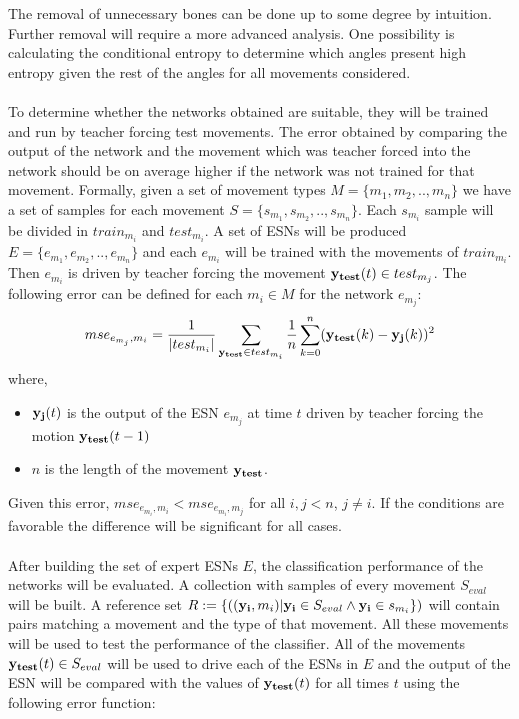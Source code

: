 \documentclass[10pt]{article}
\begin{document}
The removal of unnecessary bones can be done up to some degree by intuition. Further removal will require a more advanced analysis. One possibility is calculating the conditional entropy\cite{AILecture} to determine which angles present high entropy given the rest of the angles for all movements considered. 
\\\\
To determine whether the networks obtained are suitable, they will be trained and run by teacher forcing test movements. The error obtained by comparing the output of the network and the movement which was teacher forced into the network should be on average higher if the network was not trained for that movement. Formally, given a set of movement types $M=\{m_1,m_2,..,m_n\}$ we have a set of samples for each movement $S=\{s_{m_1},s_{m_2},..,s_{m_n}\}$. Each $s_{m_i}$ sample will be divided in $train_{m_i}$ and $test_{m_i}$. A set of ESNs will be produced $E=\{e_{m_1},e_{m_2},..,e_{m_n}\}$ and each $e_{m_i}$ will be trained with the movements of $train_{m_i}$. Then $e_{m_i}$ is driven by teacher forcing the movement ${\bf y_{test}}(t) \in test_{m_j}$. The following error can be defined for each $m_i \in M$ for the network $e_{m_j}$:
\[
mse_{e_{m_j},m_i}=\frac{1}{|test_{m_i}|}\sum_{{\bf y_{test}} \in test_{m_i}}\frac{1}{n}\sum_{k=0}^{n}({\bf y_{test}}(k) - {\bf y_j}(k))^2
\]
where, 
\begin{itemize}
  \item ${\bf y_j}(t)$ is the output of the ESN $e_{m_j}$ at time $t$ driven by teacher forcing the motion ${\bf y_{test}}(t-1)$ 
  \item $n$ is the length of the movement ${\bf y_{test}}$. 
\end{itemize}
Given this error, $mse_{e_{m_i},m_i} < mse_{e_{m_i},m_j}$ for all $i,j<n$, $j\neq i$. If the conditions are favorable the difference will be significant for all cases.
\\\\
After building the set of expert ESNs $E$, the classification performance of the networks will be evaluated. A collection with samples of every movement $S_{eval}$ will be built. A reference set $R:=\{(({\bf y_i},m_i) | {\bf y_i} \in S_{eval} \wedge {\bf y_i}\in s_{m_i}\})$ will contain pairs matching a movement and the type of that movement. All these movements will be used to test the performance of the classifier. All of the movements ${\bf y_{test}}(t)\in S_{eval}$ will be used to drive each of the ESNs in $E$ and the output of the ESN will be compared with the values of ${\bf y_{test}}(t)$ for all times $t$ using the following error function:
\end{document}
